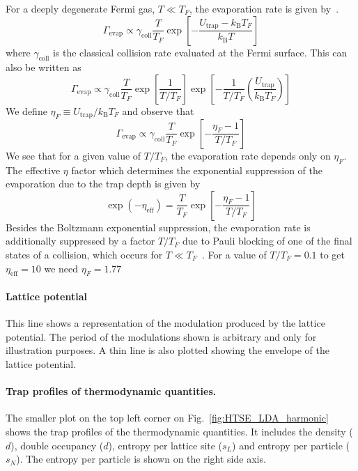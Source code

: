 \documentclass[11pt,letter]{article}
\newcommand{\kb}{\ensuremath{k_{\text{B}}}}
\begin{document}
For a deeply degenerate Fermi gas,  $T \ll T_{F}$, the evaporation rate is
given by~\cite{OHara2001}.
\begin{equation}
  \Gamma_{\text{evap}} \propto \gamma_{\text{coll}} \frac{T}{T_{F}} 
  \exp\left[ -   
  \frac{ U_{\text{trap}} - \kb T_{F} }{ \kb T }  \right ] 
\end{equation}
where $\gamma_{\text{coll}}$ is the classical collision rate evaluated at the
Fermi surface.  This can also be written as 
\begin{equation}
  \Gamma_{\text{evap}} \propto \gamma_{\text{coll}} \frac{T}{T_{F}}
  \exp\left[ \frac{1}{T/T_{F}} \right]  
  \exp\left[ -  \frac{1}{T/T_{F}} \left( \frac{U_{\text{trap}}}{\kb T_{F}} \right) \right] 
\end{equation}
We define $ \eta_{F} \equiv U_{\text{trap}}/\kb T_{F}$ and observe that 
\begin{equation}
  \Gamma_{\text{evap}} \propto \gamma_{\text{coll}} \frac{T}{T_{F}}
  \exp\left[ -  \frac{\eta_{F} - 1 }{ T/T_{F} } \right]
\end{equation}
We see that for a given value of $T/T_{F}$, the evaporation rate depends only
on $\eta_{F}$.    The effective $\eta$ factor which determines the exponential
suppression of the evaporation due to the trap depth is given by
\begin{equation}
 \exp(-\eta_{\text{eff}})  = 
  \frac{T}{T_{F}} \exp\left[- \frac{\eta_{F} - 1 }{T/T_{F} } \right]
\end{equation}
Besides the Boltzmann exponential suppression, the evaporation rate is
additionally suppressed by a factor $T/T_{F}$ due to Pauli blocking of one of
the final states of a collision, which occurs for $T\ll
T_{F}$~\cite{OHara2001}.    For a value of $T/T_{F}=0.1$ to get
$\eta_{\text{eff}}=10$ we need $\eta_{F} = 1.77 $ 

\paragraph{Lattice potential} This line shows a representation of the
modulation produced by the lattice potential.   The period of the modulations
shown is arbitrary and only for illustration purposes.  A thin line is also
plotted showing the envelope of the lattice potential.  

 
\paragraph{Trap profiles of thermodynamic quantities.}  The smaller plot on the
top left corner on Fig.~\ref{fig:HTSE_LDA_harmonic} shows the trap profiles of
the thermodynamic quantities.   It includes the density ($d$), double occupancy
($d$), entropy per lattice site ($s_{L}$) and entropy per particle ($s_{N}$).
The entropy per particle is shown on the right side axis.
\end{document}
